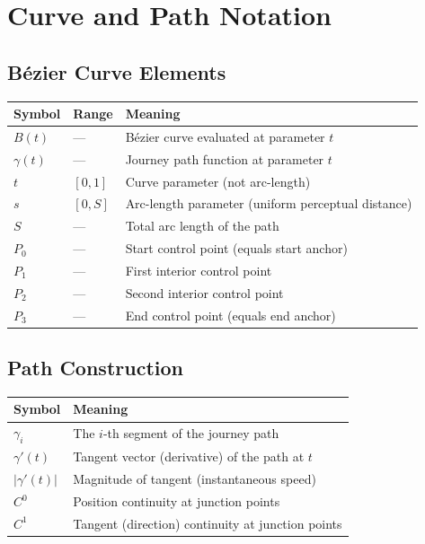 \section{Curve and Path Notation}
\label{sec:notation-curve}

\subsection{Bézier Curve Elements}

\begin{center}
\begin{tabular}{lll}
  \toprule
  \textbf{Symbol} & \textbf{Range} & \textbf{Meaning} \\
  \midrule
  $B(t)$ & --- & Bézier curve evaluated at parameter $t$ \\
  $\gamma(t)$ & --- & Journey path function at parameter $t$ \\
  $t$ & $[0, 1]$ & Curve parameter (not arc-length) \\
  $s$ & $[0, S]$ & Arc-length parameter (uniform perceptual distance) \\
  $S$ & --- & Total arc length of the path \\
  $P_0$ & --- & Start control point (equals start anchor) \\
  $P_1$ & --- & First interior control point \\
  $P_2$ & --- & Second interior control point \\
  $P_3$ & --- & End control point (equals end anchor) \\
  \bottomrule
\end{tabular}
\end{center}

\subsection{Path Construction}

\begin{center}
\begin{tabular}{ll}
  \toprule
  \textbf{Symbol} & \textbf{Meaning} \\
  \midrule
  $\gamma_i$ & The $i$-th segment of the journey path \\
  $\gamma'(t)$ & Tangent vector (derivative) of the path at $t$ \\
  $|\gamma'(t)|$ & Magnitude of tangent (instantaneous speed) \\
  $C^0$ & Position continuity at junction points \\
  $C^1$ & Tangent (direction) continuity at junction points \\
  \bottomrule
\end{tabular}
\end{center}


